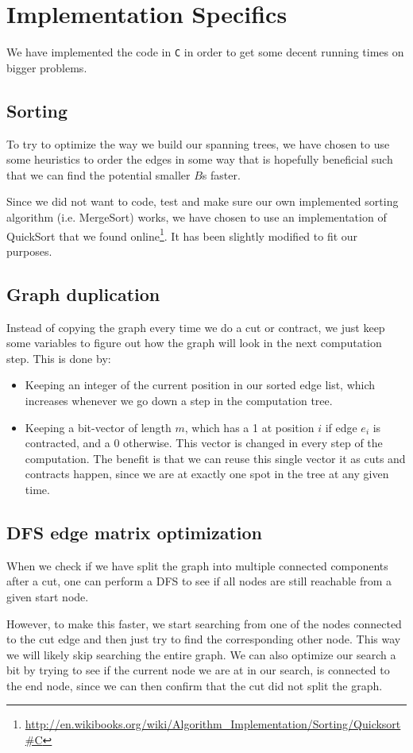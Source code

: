 \section{Implementation Specifics}

We have implemented the code in \texttt{C} in order to get some decent running times on bigger problems.

\subsection{Sorting}

To try to optimize the way we build our spanning trees, we have chosen to use some heuristics to order the edges in some way that is hopefully beneficial such that we can find the potential smaller $B$s faster.

Since we did not want to code, test and make sure our own implemented sorting algorithm (i.e. MergeSort) works, we have chosen to use an implementation of QuickSort that we found online\footnote{\url{http://en.wikibooks.org/wiki/Algorithm\_Implementation/Sorting/Quicksort\#C} }. It has been slightly modified to fit our purposes.


\subsection{Graph duplication}

Instead of copying the graph every time we do a cut or contract, we just keep some variables to figure out how the graph will look in the next computation step. This is done by:

\begin{itemize}
\item Keeping an integer of the current position in our sorted edge list, which increases whenever we go down a step in the computation tree.

\item Keeping a bit-vector of length $m$, which has a 1 at position $i$ if edge $e_i$ is contracted, and a 0 otherwise. This vector is changed in every step of the computation. The benefit is that we can reuse this single vector it as cuts and contracts happen, since we are at exactly one spot in the tree at any given time.
\end{itemize}


\subsection{DFS edge matrix optimization}

When we check if we have split the graph into multiple connected components after a cut, one can perform a DFS to see if all nodes are still reachable from a given start node. 

However, to make this faster, we start searching from one of the nodes connected to the cut edge and then just try to find the corresponding other node. This way we will likely skip searching the entire graph. We can also optimize our search a bit by trying to see if the current node we are at in our search, is connected to the end node, since we can then confirm that the cut did not split the graph.



